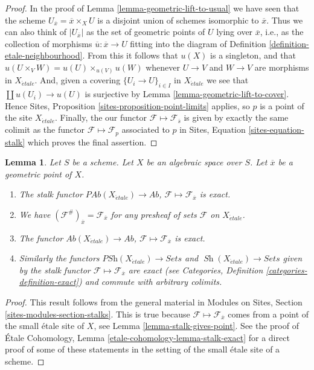 \documentclass{stacks-project}
\theoremstyle{plain}
\newtheorem{lemma}[subsection]{Lemma}
\theoremstyle{definition}
\theoremstyle{remark}
\numberwithin{equation}{subsection}
\def\Sh{\mathop{\mathit{Sh}}\nolimits}
\def\etale{{\acute{e}tale}}
\begin{document}
\begin{proof}
In the proof of
Lemma \ref{lemma-geometric-lift-to-usual}
we have seen that the scheme $U_{\overline{x}} = \overline{x} \times_X U$
is a disjoint union of
schemes isomorphic to $\overline{x}$. Thus we can also think of
$|U_{\overline{x}}|$ as the set of geometric points of $U$ lying over
$\overline{x}$, i.e., as the collection of morphisms
$\overline{u} : \overline{x} \to U$ fitting into the diagram of
Definition \ref{definition-etale-neighbourhood}.
From this it follows that $u(X)$ is a singleton, and that
$u(U \times_V W) = u(U) \times_{u(V)} u(W)$
whenever $U \to V$ and $W \to V$ are morphisms in $X_\etale$.
And, given a covering $\{U_i \to U\}_{i \in I}$ in $X_\etale$ we see
that $\coprod u(U_i) \to u(U)$ is surjective by
Lemma \ref{lemma-geometric-lift-to-cover}.
Hence
Sites, Proposition \ref{sites-proposition-point-limits}
applies, so $p$ is a point of the site $X_\etale$.
Finally, the our functor $\mathcal{F} \mapsto \mathcal{F}_{\overline{s}}$
is given by exactly the same colimit as the functor
$\mathcal{F} \mapsto \mathcal{F}_p$ associated to $p$ in
Sites, Equation \ref{sites-equation-stalk}
which proves the final assertion.
\end{proof}

\begin{lemma}
\label{lemma-stalk-exact}
Let $S$ be a scheme.
Let $X$ be an algebraic space over $S$.
Let $\overline{x}$ be a geometric point of $X$.
\begin{enumerate}
\item The stalk functor
$\textit{PAb}(X_\etale) \to \textit{Ab}$,
$\mathcal{F}  \mapsto  \mathcal{F}_{\overline{x}}$
is exact.
\item We have $(\mathcal{F}^\#)_{\overline{x}} = \mathcal{F}_{\overline{x}}$
for any presheaf of sets $\mathcal{F}$ on $X_\etale$.
\item The functor
$\textit{Ab}(X_\etale) \to \textit{Ab}$,
$\mathcal{F} \mapsto \mathcal{F}_{\overline{x}}$ is exact.
\item Similarly the functors
$\textit{PSh}(X_\etale) \to \textit{Sets}$ and
$\Sh(X_\etale) \to \textit{Sets}$ given by the stalk functor
$\mathcal{F} \mapsto \mathcal{F}_{\overline{x}}$ are exact (see
Categories, Definition \ref{categories-definition-exact})
and commute with arbitrary colimits.
\end{enumerate}
\end{lemma}

\begin{proof}
This result follows from the general material in
Modules on Sites, Section \ref{sites-modules-section-stalks}.
This is true because $\mathcal{F} \mapsto \mathcal{F}_{\overline{x}}$
comes from a point of the small \'etale site of $X$, see
Lemma \ref{lemma-stalk-gives-point}. See the proof of
\'Etale Cohomology, Lemma \ref{etale-cohomology-lemma-stalk-exact}
for a direct proof of some of these statements in the setting of
the small \'etale site of a scheme.
\end{proof}
\end{document}
